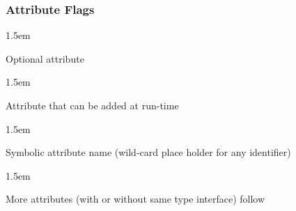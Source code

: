 \documentclass{article}
\begin{document}
\subsubsection{Attribute Flags}\label{sec3-attribute-flags}%

\begin{mddefinitions}%


\begin{mdbmarginx}{}{}{}{1.5em}%
\begin{mddefdata}%

Optional attribute%
\end{mddefdata}%
\end{mdbmarginx}%


\begin{mdbmarginx}{}{}{}{1.5em}%
\begin{mddefdata}%

Attribute that can be added at run-time%
\end{mddefdata}%
\end{mdbmarginx}%

\mddefterm{\noindent{\bfseries@x}}%

\begin{mdbmarginx}{}{}{}{1.5em}%
\begin{mddefdata}%

Symbolic attribute name (wild-card place holder for any identifier)%
\end{mddefdata}%
\end{mdbmarginx}%


\begin{mdbmarginx}{}{}{}{1.5em}%
\begin{mddefdata}%

More attributes (with or without same type interface) follow%
\end{mddefdata}%
\end{mdbmarginx}%



\end{mddefinitions}
\end{document}
